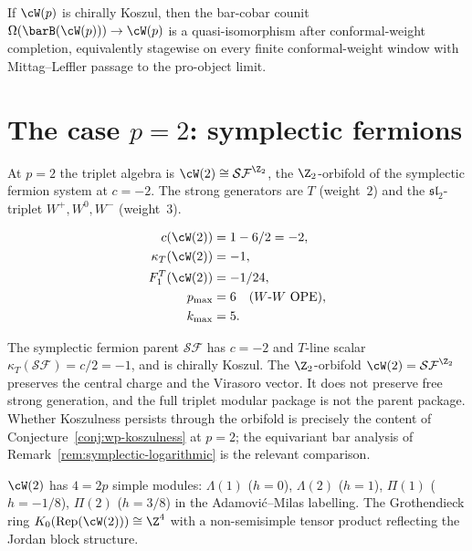 \begin{conjecture}\label{conj:wp-inversion}
If $\cW(p)$ is chirally Koszul, then the bar-cobar counit
$\Omega(\barB(\cW(p))) \to \cW(p)$
is a quasi-isomorphism after conformal-weight completion, equivalently
stagewise on every finite conformal-weight window with
Mittag--Leffler passage to the pro-object limit.
\end{conjecture}



\section{The case \texorpdfstring{$p = 2$}{p = 2}:
symplectic fermions}\label{sec:wp-p2}

At $p = 2$ the triplet algebra is $\cW(2) \cong
\mathcal{SF}^{\Z_2}$, the $\Z_2$-orbifold of the
symplectic fermion system at $c = -2$. The strong generators
are $T$ (weight~$2$) and the $\mathfrak{sl}_2$-triplet
$W^+, W^0, W^-$ (weight~$3$).

\begin{computation}[Invariants of $\cW(2)$]
\label{comp:wp-p2-invariants}
\begin{align}
 c(\cW(2)) &= 1 - 6/2 = -2, \\
 \kappa_T(\cW(2)) &= -1, \\
 F_1^T(\cW(2)) &= -1/24, \\
 p_{\max} &= 6 \quad\text{($W$-$W$ OPE)}, \\
 k_{\max} &= 5.
\end{align}
\end{computation}

The symplectic fermion parent $\mathcal{SF}$ has $c = -2$ and
$T$-line scalar $\kappa_T(\mathcal{SF}) = c/2 = -1$, and is
chirally Koszul.
The $\Z_2$-orbifold $\cW(2) = \mathcal{SF}^{\Z_2}$ preserves
the central charge and the Virasoro vector. It does not preserve
free strong generation, and the full triplet modular package is not
the parent package. Whether Koszulness persists through the orbifold
is precisely
the content of Conjecture~\ref{conj:wp-koszulness} at
$p = 2$; the equivariant bar analysis of
Remark~\ref{rem:symplectic-logarithmic} is the relevant
comparison.

\begin{remark}[Module category at $p = 2$]
\label{rem:wp-p2-modules}
$\cW(2)$ has $4 = 2p$ simple modules:
$\Lambda(1)$ ($h = 0$), $\Lambda(2)$ ($h = 1$),
$\Pi(1)$ ($h = -1/8$), $\Pi(2)$ ($h = 3/8$)
in the Adamovi\'c--Milas labelling.
The Grothendieck ring
$K_0(\operatorname{Rep}(\cW(2))) \cong \Z^4$ with a
non-semisimple tensor product reflecting the Jordan block
structure.
\end{remark}


